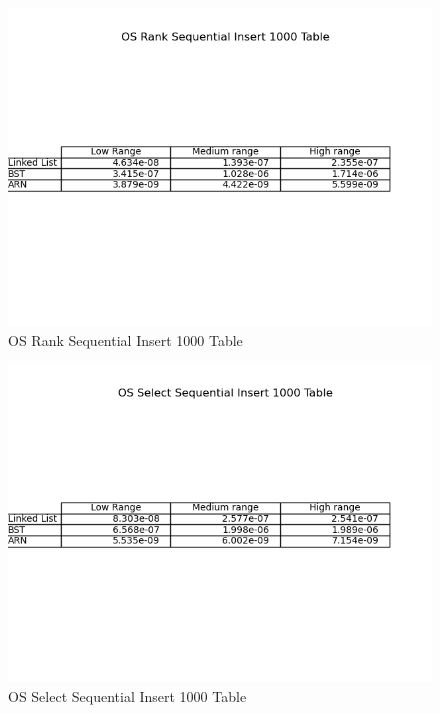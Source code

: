\documentclass[11pt]{article}
\begin{document}
 \begin{figure}[H]
  \centering
  \includegraphics[width=0.8\linewidth]{Images/1000/OS Rank Sequential Insert 1000 Table.png}
  \caption{OS Rank Sequential Insert 1000 Table }
  \label{fig:OS Rank Sequential Insert 1000 Table}
\end{figure}
 \begin{figure}[H]
  \centering
  \includegraphics[width=0.8\linewidth]{Images/1000/OS Select Sequential Insert 1000 Table.png}
  \caption{OS Select Sequential Insert 1000 Table }
  \label{fig:OS Select Sequential Insert 1000 Table}
\end{figure}
\end{document}

